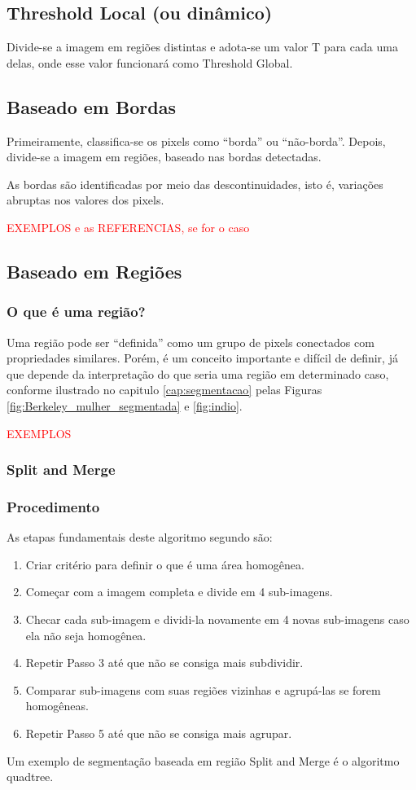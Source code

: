 \subsection*{Threshold Local (ou dinâmico)}
Divide-se a imagem em regiões distintas e adota-se um valor T para cada uma delas, onde esse valor funcionará como Threshold Global.

\subsection{Baseado em Bordas}
Primeiramente, classifica-se os pixels como “borda” ou “não-borda”.
Depois, divide-se a imagem em regiões, baseado nas bordas detectadas.

As bordas são identificadas por meio das descontinuidades, isto é, variações abruptas nos valores dos pixels. 

\textcolor{red}{EXEMPLOS e as REFERENCIAS, se for o caso}


\subsection{Baseado em Regiões}
\subsubsection*{O que é uma região?}
Uma região pode ser “definida” como um grupo de pixels conectados com propriedades similares.
Porém, é um conceito importante e difícil de definir, já que depende da interpretação do que seria uma região  em determinado caso, conforme ilustrado no capitulo \ref{cap:segmentacao} pelas Figuras \ref{fig:Berkeley_mulher_segmentada} e \ref{fig:indio}.

\textcolor{red}{EXEMPLOS}

\subsubsection{Split and Merge}
\subsubsection*{Procedimento}
As etapas fundamentais deste algoritmo segundo  são: 
\begin{enumerate}
    \item Criar critério para definir o que é uma área homogênea.
    \item Começar com a imagem completa e divide em 4 sub-imagens.
    \item Checar cada sub-imagem e dividi-la novamente em 4 novas sub-imagens caso ela não seja homogênea.
    \item Repetir Passo 3 até que não se consiga mais subdividir.
    \item Comparar sub-imagens com suas regiões vizinhas e agrupá-las se forem homogêneas.
    \item Repetir Passo 5 até que não se consiga mais agrupar.
\end{enumerate}
Um exemplo de segmentação baseada em região Split and Merge é o algoritmo quadtree.

